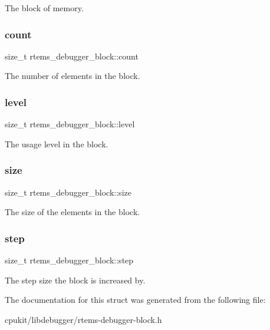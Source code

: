 The block of memory. \mbox{\label{structrtems__debugger__block_a8a94887ef54540a8d6fe75f5c936aa4f}} 
\subsubsection{\texorpdfstring{count}{count}}
{\footnotesize\ttfamily size\+\_\+t rtems\+\_\+debugger\+\_\+block\+::count}

The number of elements in the block. \mbox{\label{structrtems__debugger__block_adb6e594a5334b30a61fbdb1215f0b1c1}} 
\subsubsection{\texorpdfstring{level}{level}}
{\footnotesize\ttfamily size\+\_\+t rtems\+\_\+debugger\+\_\+block\+::level}

The usage level in the block. \mbox{\label{structrtems__debugger__block_a61b84bb4a0a3548f5bdea27bf295f30f}} 
\subsubsection{\texorpdfstring{size}{size}}
{\footnotesize\ttfamily size\+\_\+t rtems\+\_\+debugger\+\_\+block\+::size}

The size of the elements in the block. \mbox{\label{structrtems__debugger__block_ae105e424755696a260021c83604e4206}} 
\subsubsection{\texorpdfstring{step}{step}}
{\footnotesize\ttfamily size\+\_\+t rtems\+\_\+debugger\+\_\+block\+::step}

The step size the block is increased by. 

The documentation for this struct was generated from the following file\+:\begin{DoxyCompactItemize}
\item 
cpukit/libdebugger/rtems-\/debugger-\/block.\+h\end{DoxyCompactItemize}
